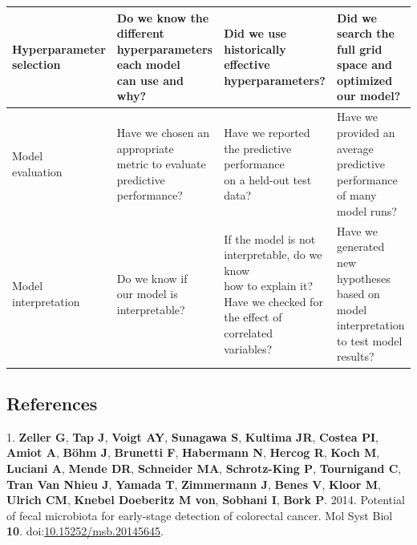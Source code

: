 \documentclass[11pt,]{article}
\begin{document}
\begin{tabular}{|l|l|l|l|}
\makecell[l]{Hyperparameter \\ selection} & \makecell[l]{Do we know the different \\ hyperparameters each model \\ can use and why?} & \makecell[l]{Did we use historically \\ effective hyperparameters? } & \makecell[l]{Did we search the \\ full grid space and \\optimized our model? } \\ \hline

\makecell[l]{Model \\ evaluation} & \makecell[l]{Have we chosen an appropriate \\ metric to evaluate \\ predictive performance?} & \makecell[l]{Have we reported \\ the predictive performance \\ on a held-out test data?} & \makecell[l]{Have we provided an average \\ predictive performance \\ of many model runs? } \\ \hline

\makecell[l]{Model \\ interpretation} & \makecell[l]{Do we know if \\ our model is \\ interpretable?} & \makecell[l]{If the model is not \\ interpretable, do we know \\how to  explain it? \\ Have we checked for \\ the effect of correlated \\ variables?} & \makecell[l]{Have we generated new \\ hypotheses based on \\ model interpretation \\ to test model results? } \\ \hline

\end{tabular}\newpage

\subsection{References}\label{references}

\hypertarget{refs}{}
\hypertarget{ref-zeller_potential_2014}{}
1. \textbf{Zeller G}, \textbf{Tap J}, \textbf{Voigt AY},
\textbf{Sunagawa S}, \textbf{Kultima JR}, \textbf{Costea PI},
\textbf{Amiot A}, \textbf{Böhm J}, \textbf{Brunetti F},
\textbf{Habermann N}, \textbf{Hercog R}, \textbf{Koch M},
\textbf{Luciani A}, \textbf{Mende DR}, \textbf{Schneider MA},
\textbf{Schrotz-King P}, \textbf{Tournigand C}, \textbf{Tran Van Nhieu
J}, \textbf{Yamada T}, \textbf{Zimmermann J}, \textbf{Benes V},
\textbf{Kloor M}, \textbf{Ulrich CM}, \textbf{Knebel Doeberitz M von},
\textbf{Sobhani I}, \textbf{Bork P}. 2014. Potential of fecal microbiota
for early-stage detection of colorectal cancer. Mol Syst Biol
\textbf{10}.
doi:\href{https://doi.org/10.15252/msb.20145645}{10.15252/msb.20145645}.
\end{document}
